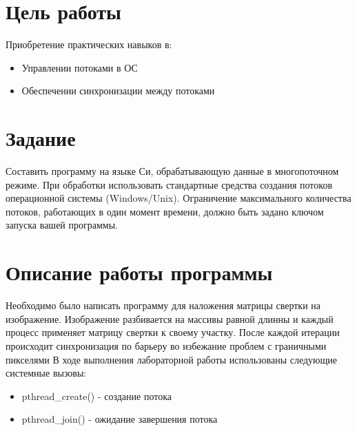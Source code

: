 \documentclass[a4paper, 12pt]{article}
\begin{document}
\section{Цель работы}
Приобретение практических навыков в:
\begin{itemize}
    \item Управлении потоками в ОС
    \item Обеспечении синхронизации между потоками
\end{itemize}

\section{Задание}
Составить программу на языке Си, обрабатывающую данные в многопоточном режиме. При обработки использовать стандартные средства создания потоков операционной системы (Windows/Unix). Ограничение максимального количества потоков, работающих в один момент времени, должно быть задано ключом запуска вашей программы.

\section{Описание работы программы}
Необходимо было написать программу для наложения матрицы свертки на изображение. Изображение разбивается на массивы равной длинны и каждый процесс применяет матрицу свертки к своему участку. После каждой итерации происходит синхронизация по барьеру во избежание проблем с граничными пикселями
В ходе выполнения лабораторной работы использованы следующие системные вызовы:
\begin{itemize}
    \item pthread\_create() - создание потока
    \item pthread\_join() - ожидание завершения потока
\end{itemize}

\newpage
\end{document}
